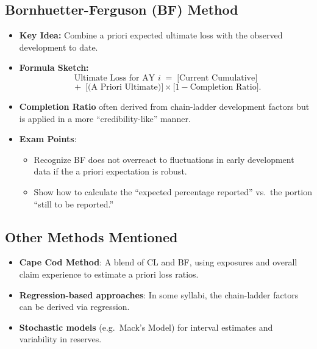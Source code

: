 \documentclass[13pt,a4paper]{article}
\begin{document}
\subsection{Bornhuetter-Ferguson (BF) Method}
\begin{itemize}
  \item \textbf{Key Idea:} Combine a priori expected ultimate loss with the observed development to date.
  \item \textbf{Formula Sketch:}
    \[
      \text{Ultimate Loss for AY }i
      \;=\; \bigl[\text{Current Cumulative}\bigr] \] \newline
      \[ 
      \;+\; \bigl[\text{(A Priori Ultimate)}\bigr]\times \bigl[1 - \text{Completion Ratio}\bigr].
    \]
  \item \textbf{Completion Ratio} often derived from chain-ladder development factors but is applied in a more “credibility-like” manner.
  \item \textbf{Exam Points}:
    \begin{itemize}
      \item Recognize BF does not overreact to fluctuations in early development data if the a priori expectation is robust.
      \item Show how to calculate the “expected percentage reported” vs.\ the portion “still to be reported.”
    \end{itemize}
\end{itemize}

\subsection{Other Methods Mentioned}
\begin{itemize}
  \item \textbf{Cape Cod Method}: A blend of CL and BF, using exposures and overall claim experience to estimate a priori loss ratios.
  \item \textbf{Regression-based approaches}: In some syllabi, the chain-ladder factors can be derived via regression.
  \item \textbf{Stochastic models} (e.g.\ Mack’s Model) for interval estimates and variability in reserves.
\end{itemize}
\end{document}
